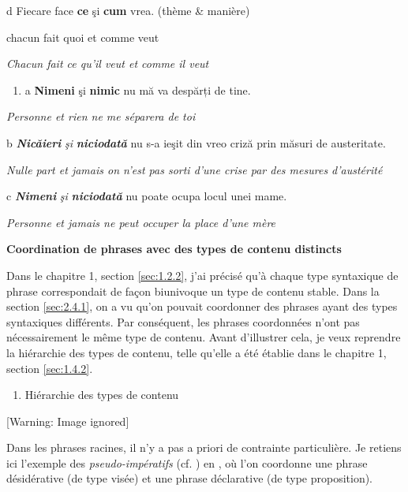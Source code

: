   d  Fiecare  face  \textbf{ce}  şi  \textbf{cum}  vrea.      (thème \& manière)

    chacun  fait  quoi  et  comme  veut

{\itshape
Chacun fait ce qu'il veut et comme il veut}


\begin{enumerate}
\item \label{bkm:Ref300779730}a  \textbf{Nimeni} şi \textbf{nimic} nu mă va despărți de tine.


\end{enumerate}
{\itshape
Personne et rien ne me séparera de toi}

b  \emph{\textbf{\textup{Nicăieri}}}\emph{\textup{ şi} }\emph{\textbf{\textup{niciodată}}} nu s-a ieşit din vreo criză prin măsuri de austeritate. 

{\itshape
Nulle part et jamais on n'est pas sorti d'une crise par des mesures d'austérité} 

c  \emph{\textbf{\textup{Nimeni}}}\emph{\textup{ şi} }\emph{\textbf{\textup{niciodată}}} nu poate ocupa locul unei mame. 

  \textit{Personne et jamais ne peut occuper la place d'une mère}

{\bfseries
Coordination de phrases avec des types de contenu distincts}

Dans le chapitre 1, section \ref{sec:1.2.2}, j'ai précisé qu'à chaque type syntaxique de phrase correspondait de façon biunivoque un type de contenu stable. Dans la section \ref{sec:2.4.1}, on a vu qu'on pouvait coordonner des phrases ayant des types syntaxiques différents. Par conséquent, les phrases coordonnées n'ont pas nécessairement le même type de contenu. Avant d'illustrer cela, je veux reprendre la hiérarchie des types de contenu, telle qu'elle a été établie dans le chapitre 1, section \ref{sec:1.4.2}.


\begin{enumerate}
\item   \label{bkm:Ref301425933}Hiérarchie des types de contenu


\end{enumerate}
{   [Warning: Image ignored] %
} 

Dans les phrases racines, il n'y a pas a priori de contrainte particulière. Je retiens ici l'exemple des \textit{pseudo-impératifs} (cf. \citet{Franke2008}) en , où l'on coordonne une phrase désidérative (de type visée) et une phrase déclarative (de type proposition). 


